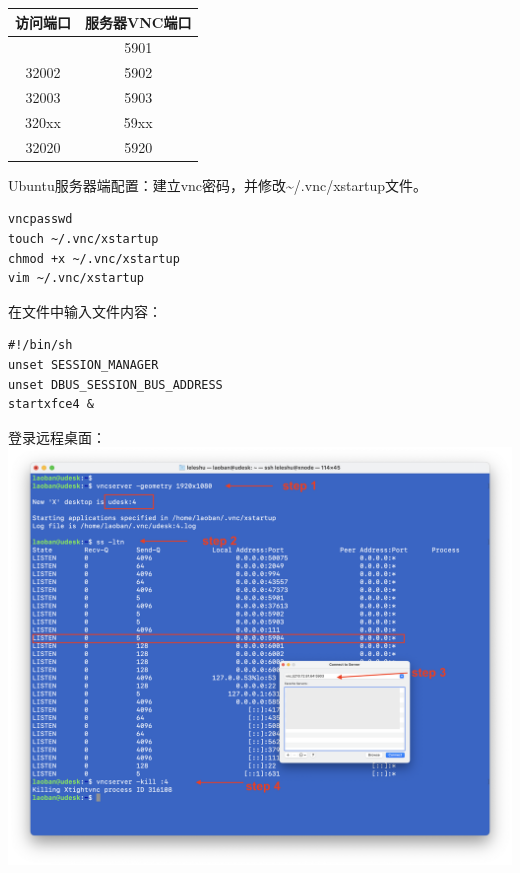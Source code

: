 \documentclass[
]{ctexbook}
\begin{document}
\begin{longtable}[]{@{}cc@{}}
\toprule\noalign{}
访问端口 & 服务器VNC端口 \\
\midrule\noalign{}
\endhead
\bottomrule\noalign{}
\endlastfoot
32001 & 5901 \\
32002 & 5902 \\
32003 & 5903 \\
320xx & 59xx \\
32020 & 5920 \\
\end{longtable}

Ubuntu服务器端配置：建立vnc密码，并修改\textasciitilde/.vnc/xstartup文件。

\begin{verbatim}
vncpasswd
touch ~/.vnc/xstartup
chmod +x ~/.vnc/xstartup
vim ~/.vnc/xstartup
\end{verbatim}

在文件中输入文件内容：

\begin{verbatim}
#!/bin/sh
unset SESSION_MANAGER
unset DBUS_SESSION_BUS_ADDRESS
startxfce4 &
\end{verbatim}

登录远程桌面：
\includegraphics{Fig/ch5/udesk_RD.png}
\end{document}
